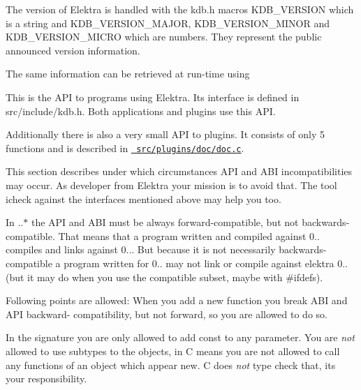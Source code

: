 The version of Elektra is handled with the kdb.\+h macros {\ttfamily K\+D\+B\+\_\+\+V\+E\+R\+S\+I\+ON} which is a string and {\ttfamily K\+D\+B\+\_\+\+V\+E\+R\+S\+I\+O\+N\+\_\+\+M\+A\+J\+OR}, {\ttfamily K\+D\+B\+\_\+\+V\+E\+R\+S\+I\+O\+N\+\_\+\+M\+I\+N\+OR} and {\ttfamily K\+D\+B\+\_\+\+V\+E\+R\+S\+I\+O\+N\+\_\+\+M\+I\+C\+RO} which are numbers. They represent the public announced version information.

The same information can be retrieved at run-\/time using


\begin{DoxyCode}{0}
\end{DoxyCode}


This is the A\+PI to programs using Elektra. Its interface is defined in src/include/kdb.h. Both applications and plugins use this A\+PI.

Additionally there is also a very small A\+PI to plugins. It consists of only 5 functions and is described in \href{/home/mpranj/workspace/libelektra/src/plugins/doc/doc.c}{\texttt{ src/plugins/doc/doc.\+c}}.

This section describes under which circumstances A\+PI and A\+BI incompatibilities may occur. As developer from Elektra your mission is to avoid that. The tool icheck against the interfaces mentioned above may help you too.

In {..$\ast$} the A\+PI and A\+BI must be always forward-\/compatible, but not backwards-\/compatible. That means that a program written and compiled against 0.. compiles and links against 0... But because it is not necessarily backwards-\/compatible a program written for 0.. may not link or compile against elektra 0.. (but it may do when you use the compatible subset, maybe with \#ifdefs).

Following points are allowed\+: When you add a new function you break A\+BI and A\+PI backward-\/ compatibility, but not forward, so you are allowed to do so.

In the signature you are only allowed to add const to any parameter. You are {\itshape not} allowed to use subtypes to the objects, in C means you are not allowed to call any functions of an object which appear new. C does {\itshape not} type check that, it\textquotesingle{}s your responsibility.

